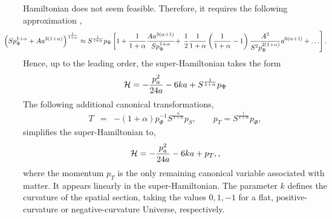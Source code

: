 Hamiltonian does not seem feasible. Therefore, it requires the
following approximation \cite{Buahmadi},
\begin{eqnarray}
\hspace{-1cm}\left(S p_{\Phi}^{1+\alpha}+ A a^{3(1+\alpha)}\right) ^{\frac1{1+\alpha}}\approx S^{\frac{1}{1+\alpha}} p_{\Phi}\left[
1+\frac1{1+\alpha}\frac{ Aa^{3(\alpha+1)}}{S p_{\Phi}^{1+\alpha}}+\right. \left.\frac12\frac1{1+\alpha}\left( \frac1{1+\alpha}-1\right)
\frac{A^{2}}{S^2 p_{\Phi}^{2(1+\alpha)}}a^{6(\alpha+1)}+\ldots\right]. \nonumber \\
\end{eqnarray}
Hence, up to the leading order, the super-Hamiltonian takes the form
\begin{equation}
{\cal H} = - \frac{p_a^2}{24a}-6ka +S^{\frac{1}{1+\alpha}} p_{\Phi}
\end{equation}
 The following additional canonical transformations,
\begin{eqnarray}
T &=& -(1+\alpha)p_\Phi^{-1}  S^{\frac{\alpha}{1+\alpha}}p_S, \quad \quad p_T =S^{\frac{1}{1+\alpha}} p_\Phi,
\end{eqnarray}
simplifies the super-Hamiltonian to,
\begin{equation}
{\cal H} = - \frac{p_a^2}{24a} -6ka + p_T , ,\label{EqHamiltonian}
\end{equation}
where the momentum $p_T$ is the only remaining canonical variable associated with matter. It appears linearly in the super-Hamiltonian. The parameter
$k$ defines the curvature of the spatial section, taking the values $0, 1, - 1$ for a flat, positive-curvature or negative-curvature Universe,
respectively.

